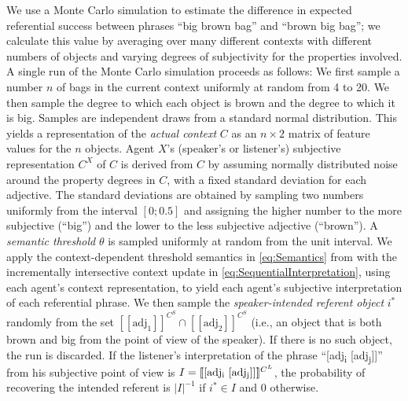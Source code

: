 \documentclass[12pt]{article}
\newcommand{\den}[1]{\ensuremath{[\![#1]\!]}}
\begin{document}
We use a Monte Carlo simulation to estimate the difference in expected referential success between phrases ``big brown bag'' and ``brown big bag''; we calculate this value by averaging over many different contexts with different numbers of objects and varying degrees of subjectivity for the properties involved. 
A single run of the Monte Carlo simulation proceeds as follows: 
We first sample a number $n$ of bags in the current context uniformly at random from 4 to 20. 
We then sample the degree to which each object is brown and the degree to which it is big. Samples are independent draws from a standard normal distribution. This yields a representation of the \emph{actual context} $C$ as an $n \times 2$ matrix of feature values for the $n$ objects. 
Agent $X$'s (speaker's or listener's) subjective representation $C^X$ of $C$ is derived from $C$ by assuming normally distributed noise around the property degrees in $C$, with a fixed standard deviation for each adjective. 
The standard deviations are obtained by sampling two numbers uniformly from the interval $[0;0.5]$ and assigning the higher number to the more subjective (``big'') and the lower to the less subjective adjective (``brown''). 
A \emph{semantic threshold} $\theta$ is sampled uniformly at random from the unit interval. We apply the context-dependent threshold semantics in \eqref{eq:Semantics} from  with the incrementally intersective context update in \eqref{eq:SequentialInterpretation}, using each agent's context representation, to yield each agent's subjective interpretation of each referential phrase. We then sample the \emph{speaker-intended referent object} $i^*$ randomly from the set $\den{\text{adj}_1}^{C^S} \cap \den{\text{adj}_2}^{C^S}$ (i.e., an object that is both brown and big from the point of view of the speaker). If there is no such object, the run is discarded. If the listener's interpretation of the phrase ``[adj\textsubscript{i} [adj\textsubscript{j}]]'' from his subjective point of view is $I = \den{\text{[adj\textsubscript{i} [adj\textsubscript{j}]]}}^{C^L}$, the probability of recovering the intended referent is $|I|^{-1}$ if $i^* \in I$ and 0 otherwise. 
\end{document}
